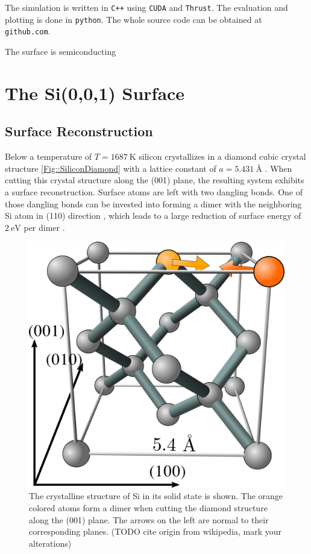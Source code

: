 	The simulation is written in \texttt{C++} using \texttt{CUDA} and \texttt{Thrust}. The evaluation and plotting is done in \texttt{python}. The whole source code can be obtained at \texttt{github.com}.
	
	The surface is semiconducting \cite{himpsel1979photoemission, uhrberg1981experimental, handa1989plasma} \\
	
	
	\chapter{The Si(0,0,1) Surface} \label{Section::Silicon}
	\section{Surface Reconstruction}
	Below a temperature of $T =	1687~\text{K}$ silicon crystallizes in a diamond cubic crystal structure \autoref{Fig::SiliconDiamond} with a lattice constant of $a =	5.431~\text{\AA} $ \cite{tiesinga2021codata}. When cutting this crystal structure along the (001) plane, the resulting system exhibits a surface reconstruction. Surface atoms are left with two dangling bonds. One of those dangling bonds can be invested into forming a dimer with the neighboring Si atom in (110) direction \cite{chadi1979atomic}, which leads to a large reduction of surface energy of $2~\text{eV}$ per dimer \cite{ramstad1995theoretical}.
	\begin{figure}[htp]
		\centering
		\includegraphics[width=0.7\linewidth]{graphics/Sili.png}
		\caption{The crystalline structure of Si in its solid state is shown. The orange colored atoms form a dimer when cutting the diamond structure along the (001) plane. The arrows on the left are normal to their corresponding planes. (TODO cite origin from wikipedia, mark your alterations)}
		\label{Fig::SiliconDiamond}
	\end{figure}
	
